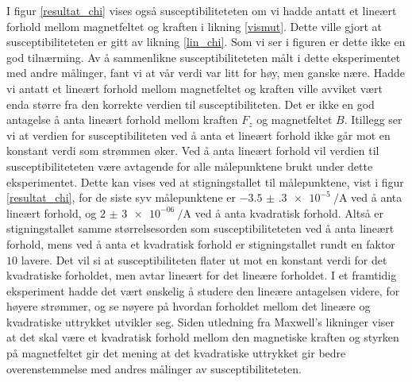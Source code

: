\documentclass[%
 reprint,
nofootinbib,
aps,
]{revtex4-1}
\begin{document}
I figur \vref{resultat_chi} vises også susceptibiliteteten om vi hadde antatt et lineært forhold mellom magnetfeltet og kraften i likning \eqref{vismut}. Dette ville gjort at susceptibiliteteten er gitt av likning \eqref{lin_chi}. Som vi ser i figuren er dette ikke en god tilnærming. Av å sammenlikne susceptibiliteteten målt i dette eksperimentet med andre målinger, fant vi at vår verdi var litt for høy, men ganske nære. Hadde vi antatt et lineært forhold mellom magnetfeltet og kraften ville avviket vært enda større fra den korrekte verdien til susceptibiliteten. Det er ikke en god antagelse å anta lineært forhold mellom kraften $F_z$ og magnetfeltet $B$. Itillegg ser vi at verdien for susceptibiliteten ved å anta et lineært forhold ikke går mot en konstant verdi som strømmen øker. Ved å anta lineært forhold vil verdien til susceptibiliteteten være avtagende for alle målepunktene brukt under dette eksperimentet. Dette kan vises ved at stigningstallet til målepunktene, vist i figur \vref{resultat_chi}, for de siste syv målepunktene er $\SI{-3.5(3)e-5}{\per\ampere}$ ved å anta lineært forhold, og $\SI{2(3)e-06}{\per\ampere}$ ved å anta kvadratisk forhold. Altså er stigningstallet samme størrelsesorden som susceptibiliteteten ved å anta lineært forhold, mens ved å anta et kvadratisk forhold er stigningstallet rundt en faktor $10$ lavere. Det vil si at susceptibiliteten flater ut mot en konstant verdi for det kvadratiske forholdet, men avtar lineært for det lineære forholdet.
I et framtidig eksperiment hadde det vært ønskelig å studere den lineære antagelsen videre, for høyere strømmer, og se nøyere på hvordan forholdet mellom det lineære og kvadratiske uttrykket utvikler seg. Siden utledning fra Maxwell's likninger viser at det skal være et kvadratisk forhold mellom den magnetiske kraften og styrken på magnetfeltet gir det mening at det kvadratiske uttrykket gir bedre overenstemmelse med andres målinger av susceptibiliteteten.
\par
\end{document}
